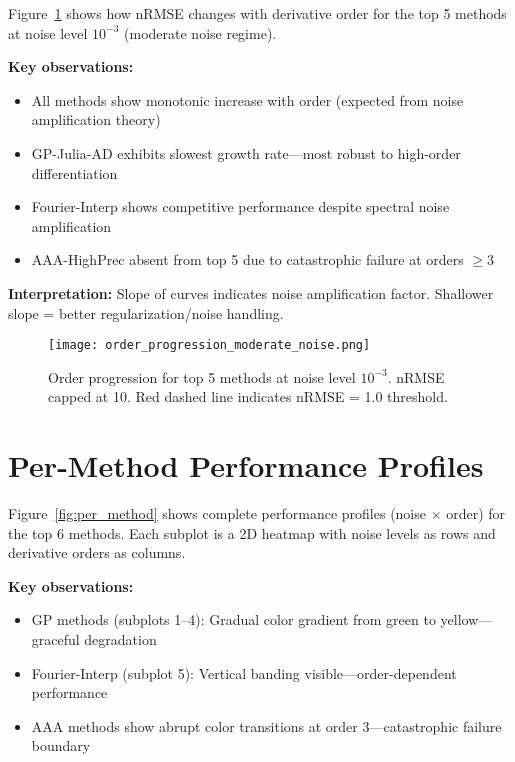 \documentclass[11pt]{article}
\begin{document}
Figure~\ref{fig:order_progression} shows how nRMSE changes with derivative order for the top 5 methods at noise level $10^{-3}$ (moderate noise regime).

\textbf{Key observations:}
\begin{itemize}
    \item All methods show monotonic increase with order (expected from noise amplification theory)
    \item GP-Julia-AD exhibits slowest growth rate---most robust to high-order differentiation
    \item Fourier-Interp shows competitive performance despite spectral noise amplification
    \item AAA-HighPrec absent from top 5 due to catastrophic failure at orders $\geq 3$
\end{itemize}

\textbf{Interpretation:} Slope of curves indicates noise amplification factor. Shallower slope = better regularization/noise handling.

\begin{figure}[p]
\centering
\texttt{[image: order\_progression\_moderate\_noise.png]}
\caption{Order progression for top 5 methods at noise level $10^{-3}$. nRMSE capped at 10. Red dashed line indicates nRMSE = 1.0 threshold.}
\label{fig:order_progression}
\end{figure}

\clearpage


\section{Per-Method Performance Profiles}

Figure~\ref{fig:per_method} shows complete performance profiles (noise $\times$ order) for the top 6 methods. Each subplot is a 2D heatmap with noise levels as rows and derivative orders as columns.

\textbf{Key observations:}
\begin{itemize}
    \item GP methods (subplots 1--4): Gradual color gradient from green to yellow---graceful degradation
    \item Fourier-Interp (subplot 5): Vertical banding visible---order-dependent performance
    \item AAA methods show abrupt color transitions at order 3---catastrophic failure boundary
\end{itemize}
\end{document}
